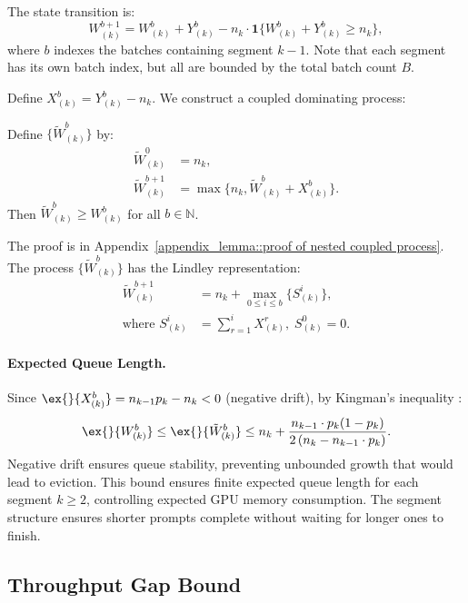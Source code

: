 The state transition is:
$$W^{b+1}_{(k)}=W^{b}_{(k)}+Y^b_{(k)} - n_{k}\cdot \mathbf{1}\{ W^{b}_{(k)}+Y^b_{(k)}\geq n_{k}  \},$$
where $b$ indexes the batches containing segment $k-1$. Note that each segment has its own batch index, but all are bounded by the total batch count $B$.

Define $X^b_{(k)} = Y^b_{(k)} - n_{k}$. We construct a coupled dominating process:
\begin{lemma}\label{lemma::nested coupled process}
Define $\{ \tilde{W}^b_{(k)} \}$ by:
\begin{equation*}
\begin{aligned}
\tilde{W}^0_{(k)} &= n_{k}, \\
\tilde{W}^{b+1}_{(k)} &= \max\{ n_{k},\tilde{W}^{b}_{(k)} + X^b_{(k)}\}.
\end{aligned}
\end{equation*}
Then $\tilde{W}_{(k)}^b \geq W^b_{(k)}$ for all $b\in \mathbb{N}$.
\end{lemma}
\noindent The proof is in Appendix~\ref{appendix_lemma::proof of nested coupled process}. The process $\{\tilde{W}^b_{(k)}\}$ has the Lindley representation:
\begin{equation*}
\begin{aligned}
\tilde{W}^{b+1}_{(k)} &=n_{k}+ \max_{0\leq i\leq b}\{ S^i_{(k)} \},\\
\text{where } S^i_{(k)} &= \sum_{r=1}^i X^r_{(k)},\; S^0_{(k)}=0.
\end{aligned}
\end{equation*}

\paragraph{Expected Queue Length.} Since $\ex{}{X^b_{(k)}} = n_{k-1} p_k - n_{k}<0$ (negative drift), by Kingman's inequality \citep{kingman1962queues}:
$$\ex{}{W^b_{(k)}}\leq \ex{}{\tilde{W}^b_{(k)}}\leq n_k+\frac{n_{k-1}\cdot p_k(1-p_k)}{2\left(n_{k}-n_{k-1}\cdot p_k\right)}.$$
Negative drift ensures queue stability, preventing unbounded growth that would lead to eviction. This bound ensures finite expected queue length for each segment $k \geq 2$, controlling expected GPU memory consumption. The segment structure ensures shorter prompts complete without waiting for longer ones to finish.

\subsection{Throughput Gap Bound}

